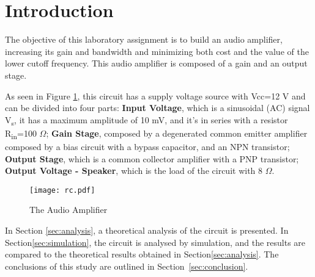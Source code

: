 \section{Introduction}
\label{sec:introduction}

The objective of this laboratory assignment is to build an audio amplifier, increasing its gain and bandwidth and minimizing both cost and the value of the lower cutoff frequency. This audio amplifier is composed of a gain and an output stage.

As seen in Figure \ref{fig:rc}, this circuit has a supply voltage source with Vcc=12 V and can be divided into four parts: \textbf{Input Voltage}, which is a sinusoidal (AC) signal V\textsubscript s, it has a maximum amplitude of 10 mV, and it's in series with a resistor R\textsubscript{in}=100 $\Omega$; \textbf{Gain Stage}, composed by a degenerated common emitter amplifier composed by a bias circuit with a bypass capacitor, and an NPN transistor; \textbf{Output Stage}, which is a common collector amplifier with a PNP transistor; \textbf{Output Voltage - Speaker}, which is the load of the circuit with 8 $\Omega$.


\begin{figure}[h] \centering
\texttt{[image: rc.pdf]}
\vspace{-5mm}
\caption{The Audio Amplifier}\label{fig:rc}
\end{figure}



In Section \ref{sec:analysis}, a theoretical analysis of the circuit is presented. In Section\ref{sec:simulation}, the circuit is analysed by simulation, and the results are compared to the theoretical results obtained in Section\ref{sec:analysis}. The conclusions of this study are outlined in Section~\ref{sec:conclusion}.






